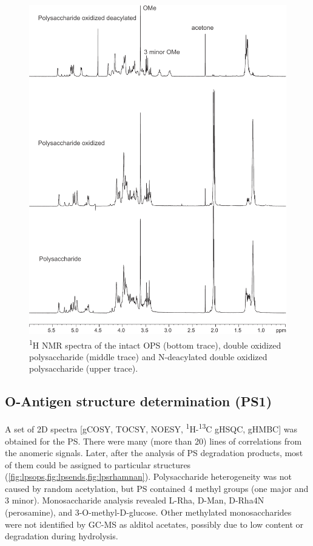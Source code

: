 		\begin{figure}[ph]
			\begin{center}
				\includegraphics[height=0.9\textheight]{lps_chapter/img/lpsfig1.pdf}
			\end{center}
			\caption[\textsuperscript{1}H \ac{NMR} spectra of \caulobacter{} \ac{OPS}]{\textsuperscript{1}H \ac{NMR} spectra of the intact \caulobacter{} \ac{OPS}  (bottom trace), double oxidized polysaccharide (middle trace) and N-deacylated double oxidized polysaccharide (upper trace).}
			\label{fig:lpsfig1}
		\end{figure}

	\subsection{O-Antigen structure determination (PS1)} %
	\label{sub:o_antigen_structure_determination_ps1_}

		A set of 2D spectra [\ac{gCOSY}, \ac{TOCSY}, \ac{NOESY}, \textsuperscript{1}H-\textsuperscript{13}C \ac{gHSQC}, \ac{gHMBC}] was obtained for the \ac{PS}. There were many (more than 20) lines of correlations from the anomeric signals. Later, after the analysis of \ac{PS} degradation products, most of them could be assigned to particular structures (\cref{fig:lpsops,fig:lpsends,fig:lpsrhamnan}). Polysaccharide heterogeneity was not caused by random acetylation, but \ac{PS} contained 4 methyl groups (one major and 3 minor). Monosaccharide analysis revealed L-Rha, D-Man, D-Rha4N (perosamine), and 3-O-methyl-D-glucose. Other methylated monosaccharides were not identified by GC-MS as alditol acetates, possibly due to low content or degradation during hydrolysis.

